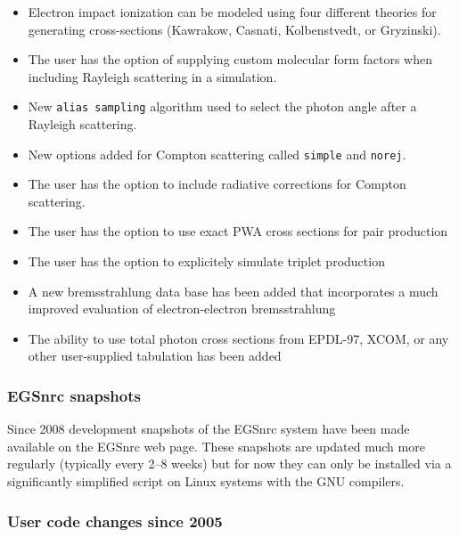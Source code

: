 \begin{itemize}

  \item Electron impact ionization can be modeled using four different theories
        for generating cross-sections (Kawrakow, Casnati, Kolbenstvedt, or
        Gryzinski).

  \item The user has the option of supplying custom molecular form factors
        when including Rayleigh scattering in a simulation.

  \item New {\tt alias sampling} algorithm used to select the
        photon angle after a Rayleigh scattering.

  \item New options added for Compton scattering called {\tt simple} and
        {\tt norej}.

  \item The user has the option to include radiative corrections for Compton
        scattering.

  \item The user has the option to use exact PWA cross sections for pair
        production

  \item The user has the option to explicitely simulate triplet production

  \item A new bremsstrahlung data base has been added that incorporates a much
        improved evaluation of electron-electron bremsstrahlung

  \item The ability to use total photon cross sections from EPDL-97, XCOM,
        or any other user-supplied tabulation has been added


\end{itemize}

\subsubsection{ EGSnrc snapshots }

Since 2008 development snapshots of the EGSnrc system have been made
available on the EGSnrc web page. These snapshots are updated much more
regularly (typically every 2--8 weeks) but for now they can only be installed
via a significantly simplified script on Linux systems with the GNU compilers.

\subsubsection{User code changes since 2005}

